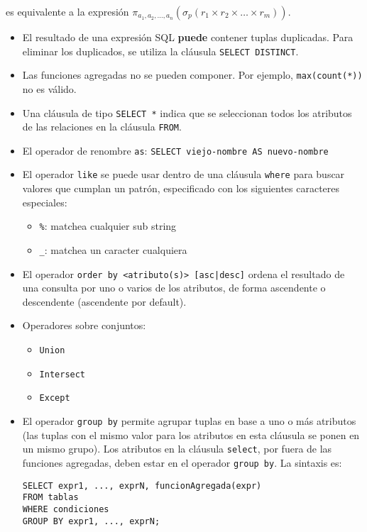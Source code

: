 \documentclass[a4paper, twoside]{article}
\begin{document}
es equivalente a la expresión $\pi_{a_{1},a_{2},\dots,a_{n}}\left(\sigma_{p}\left(r_{1}\times r_{2}\times\dots\times r_{m}\right)\right)$.
\begin{itemize}
\item El resultado de una expresión SQL \textbf{puede} contener tuplas duplicadas.
Para eliminar los duplicados, se utiliza la cláusula \texttt{SELECT
DISTINCT}.
\item Las funciones agregadas no se pueden componer. Por ejemplo, \texttt{max(count({*}))}
no es válido.
\item Una cláusula de tipo \texttt{SELECT {*}} indica que se seleccionan
todos los atributos de las relaciones en la cláusula \texttt{FROM}.
\item El operador de renombre \texttt{as}: \texttt{SELECT viejo-nombre AS
nuevo-nombre}
\item El operador \texttt{like} se puede usar dentro de una cláusula \texttt{where}
para buscar valores que cumplan un patrón, especificado con los siguientes
caracteres especiales: 

\begin{itemize}
\item \texttt{\%}: matchea cualquier sub string
\item \texttt{\_}: matchea un caracter cualquiera
\end{itemize}
\item El operador \texttt{order by <atributo(s)> {[}asc|desc{]}} ordena
el resultado de una consulta por uno o varios de los atributos, de
forma ascendente o descendente (ascendente por default).
\item Operadores sobre conjuntos:

\begin{itemize}
\item \texttt{Union}
\item \texttt{Intersect}
\item \texttt{Except}
\end{itemize}
\item El operador \texttt{group by} permite agrupar tuplas en base a uno
o más atributos (las tuplas con el mismo valor para los atributos
en esta cláusula se ponen en un mismo grupo). Los atributos en la
cláusula \texttt{select}, por fuera de las funciones agregadas, deben
estar en el operador \texttt{group by}. La sintaxis es:


\begin{lstlisting}
SELECT expr1, ..., exprN, funcionAgregada(expr)
FROM tablas
WHERE condiciones
GROUP BY expr1, ..., exprN;
\end{lstlisting}




\end{itemize}
\end{document}

